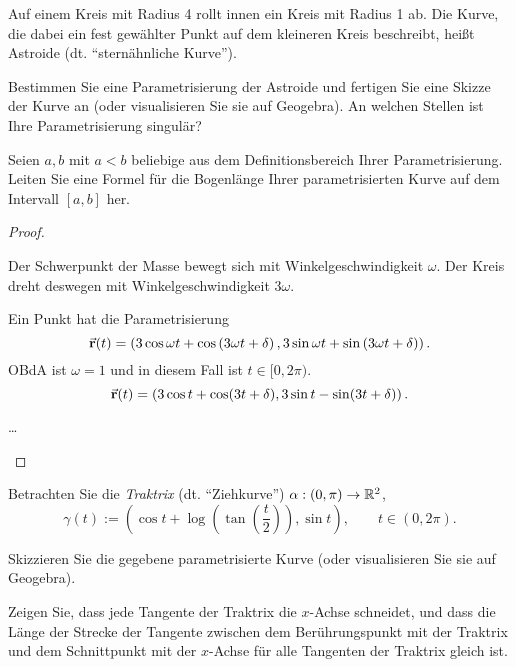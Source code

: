 \begin{Problem}
Auf einem Kreis mit Radius 4 rollt innen ein Kreis mit Radius 1 ab. Die Kurve, die dabei ein fest gewählter Punkt auf dem kleineren Kreis beschreibt, heißt Astroide (dt. ``sternähnliche Kurve''). 	
\begin{parts}
	\item Bestimmen Sie eine Parametrisierung der Astroide und fertigen Sie eine Skizze der Kurve an (oder visualisieren Sie sie auf Geogebra). An welchen Stellen ist Ihre Parametrisierung singulär?
	\item Seien $a,b$ mit $a<b$ beliebige aus dem Definitionsbereich Ihrer Parametrisierung. Leiten Sie eine Formel für die Bogenlänge Ihrer parametrisierten Kurve auf dem Intervall $[a, b]$ her.  
\end{parts}
\end{Problem}
\begin{proof}
	\begin{parts}
	\item Der Schwerpunkt der Masse bewegt sich mit Winkelgeschwindigkeit $\omega$. Der Kreis dreht deswegen mit Winkelgeschwindigkeit $3\omega$. 

		Ein Punkt hat die Parametrisierung
		 \[
		\va r(t)=\left( 3\cos \omega t + \cos\left(3\omega t+\delta\right),3\sin\omega t + \sin\left( 3\omega t +\delta\right)   \right) 
		.\] 
		OBdA ist $\omega=1$ und in diesem Fall ist $t\in [0,2\pi)$. 
		\[
		\va r(t)=\left( 3\cos t + \cos(3t+\delta), 3\sin t-\sin(3t+\delta)  \right) 
		.\] 
		\begin{center}
		\end{center}
	\item \ldots
	\end{parts}
\end{proof}
\begin{Problem}
	Betrachten Sie die \emph{Traktrix} (dt. ``Ziehkurve'') $\alpha:(0,\pi)\to \mathbb{R}^2$,
	\[
	\gamma(t):=\left( \cos t+\log\left( \tan\left( \frac{t}{2} \right)  \right), \sin t \right),\qquad t\in (0,2\pi)
	.\] 
	\begin{parts}
	\item Skizzieren Sie die gegebene parametrisierte Kurve (oder visualisieren Sie sie auf Geogebra). 
	\item Zeigen Sie, dass jede Tangente der Traktrix die $x$-Achse schneidet, und dass die Länge der Strecke der Tangente zwischen dem Berührungspunkt mit der Traktrix und dem Schnittpunkt mit der $x$-Achse für alle Tangenten der Traktrix gleich ist. 
	\end{parts}
\end{Problem}
